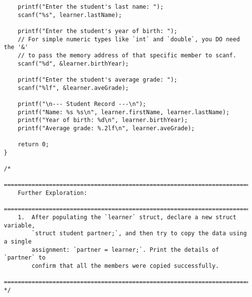 \documentclass[11pt]{book}
\begin{document}
\begin{verbatim}
    printf("Enter the student's last name: ");
    scanf("%s", learner.lastName);

    printf("Enter the student's year of birth: ");
    // For simple numeric types like `int` and `double`, you DO need the '&'
    // to pass the memory address of that specific member to scanf.
    scanf("%d", &learner.birthYear);

    printf("Enter the student's average grade: ");
    scanf("%lf", &learner.aveGrade);

    printf("\n--- Student Record ---\n");
    printf("Name: %s %s\n", learner.firstName, learner.lastName);
    printf("Year of birth: %d\n", learner.birthYear);
    printf("Average grade: %.2lf\n", learner.aveGrade);

    return 0;
}

/*
    ================================================================================
    Further Exploration:
    ================================================================================
    1.  After populating the `learner` struct, declare a new struct variable,
        `struct student partner;`, and then try to copy the data using a single
        assignment: `partner = learner;`. Print the details of `partner` to
        confirm that all the members were copied successfully.
    ================================================================================
*/

\end{verbatim}
\clearpage
\end{document}
